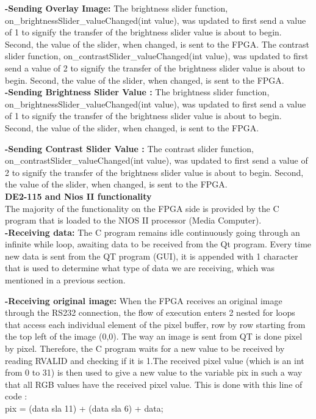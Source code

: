 \documentclass{article}
\begin{document}
\begin{multicols*}{2}
{\bf-Sending Overlay Image:}
The brightness slider function, on\_brightnessSlider\_valueChanged(int value), was updated to first send a value of 1 to signify the transfer of the brightness slider value is about to begin. Second, the value of the slider, when changed, is sent to the FPGA.
The contrast slider function, on\_contrastSlider\_valueChanged(int value), was updated to first send a value of 2 to signify the transfer of the brightness slider value is about to begin. Second, the value of the slider, when changed, is sent to the FPGA.\\

{\bf-Sending Brightness Slider Value :}
The brightness slider function, on\_brightnessSlider\_valueChanged(int value), was updated to first send a value of 1 to signify the transfer of the brightness slider value is about to begin. Second, the value of the slider, when changed, is sent to the FPGA.

{\bf-Sending Contrast Slider Value :}
The contrast slider function, on\_contrastSlider\_valueChanged(int value), was updated to first send a value of 2 to signify the transfer of the brightness slider value is about to begin. Second, the value of the slider, when changed, is sent to the FPGA.\\

{\bf DE2-115 and Nios II functionality}\\
The majority of the functionality on the FPGA side is provided by the C program that is loaded to the NIOS II processor (Media Computer).\\

{\bf-Receiving data:}
The C program remains idle continuously going through an infinite while loop, awaiting data to be received from the Qt program.
Every time new data is sent from the QT program (GUI), it is appended with 1 character that is used to determine what type of data we are receiving, which was mentioned in a previous section.


{\bf-Receiving original image:}
When the FPGA receives an original image through the RS232 connection, the flow of execution enters 2 nested for loops that access each individual element of the pixel buffer, row by row starting from the top left of the image (0,0). The way an image is sent from QT is done pixel by pixel. Therefore, the C program waits for a new value to be received by reading RVALID and checking if it is 1.The received pixel value (which is an int from 0 to 31) is then used to give a new value to the variable pix in such a way that all RGB values have the received pixel value.  
This is done with this line of code : \\
pix = (data sla 11) + (data  sla 6) + data;\\


\end{multicols*}
\end{document}

